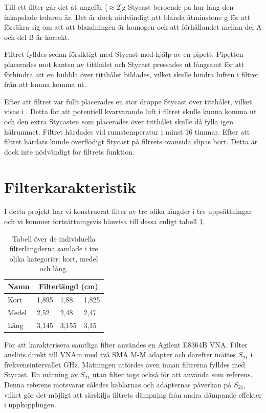 \documentclass[main.tex]{subfiles}
\begin{document}
Till ett filter går det åt ungefär \unit[$\approx 2$]{g} Stycast beroende på hur lång den inkapslade ledaren är. Det är dock nödvändigt att blanda åtminstone \unit[10]{g} för att försäkra sig om att att blandningen är homogen och att förhållandet mellan del A och del B är korrekt. 

Filtret fylldes sedan försiktigt med Stycast med hjälp av en pipett. Pipetten placerades mot kanten av titthålet och Stycast pressades ut långsamt för att förhindra att en bubbla över titthålet bildades, vilket skulle hindra luften i filtret från att kunna komma ut. 

Efter att filtret var fullt placerades en stor droppe Stycast över titthålet, vilket visas i . Detta för att potentiell kvarvarande luft i filtret skulle kunna komma ut och den extra Stycasten som placerades över titthålet skulle då fylla igen hålrummet. Filtret härdades vid rumstemperatur i minst 16 timmar. Efter att filtret härdats kunde överflödigt Stycast på filtrets ovansida slipas bort. Detta är dock inte nödvändigt för filtrets funktion.


\section{Filterkarakteristik}
\label{sec:filter_kar}
I detta projekt har vi konstruerat filter av tre olika längder i tre uppsättningar och vi kommer fortsättningsvis hänvisa till dessa enligt tabell \ref{tab:filter_list}.

\begin{table}[h]
    \centering
    \caption{Tabell över de individuella filterlängderna samlade i tre olika kategorier: kort, medel och lång.}
    \label{tab:filter_list}
    \begin{tabular}{llll}\toprule
        Namn & \multicolumn{3}{c}{Filterlängd (\unit{cm})} \\
        \midrule
        Kort & 1,895 & 1,88 & 1,825 \\
        Medel & 2,52 & 2,48 & 2,47 \\
        Lång & 3,145 & 3,155 & 3,15\\
        \bottomrule
    \end{tabular}
\end{table}

För att karakterisera samtliga filter användes en Agilent E8364B VNA. Filter anslöts direkt till VNA:n med två SMA M-M adapter och därefter mättes $S_{21}$ i frekvensintervallet \unit[1-50]{GHz}. Mätningen utfördes även innan filtrerna fylldes med Stycast. En mätning av $S_{21}$ utan filter togs också för att använda som referens. Denna referens motsvarar således kablarnas och adapternas påverkan på $S_{21}$, vilket gör det möjligt att särskilja filtrets dämpning från andra dämpande effekter i uppkopplingen.%
\end{document}
